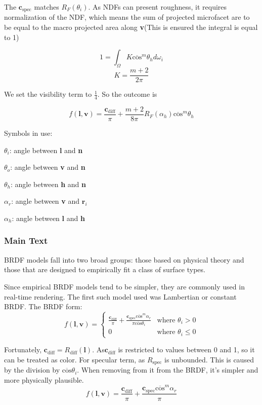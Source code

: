 \documentclass[10pt, a4paper]{article}
\begin{document}
            The $\textbf{c}_{\text{spec}}$ matches $R_F(\theta_i)$. As NDFs can present roughness, it requires normalization of the NDF, which means the sum of projected microfacet are to be equal to the macro projected area along \textbf{v}(This is ensured the integral is equal to 1)

            $$1 = \int_{\Omega}K\overline{\text{cos}}^m\theta_hd\omega_i$$
            $$K = \frac{m + 2}{2\pi}$$

            We set the visibility term to $\frac{1}{4}$. So the outcome is
            
            $$f(\textbf{l}, \textbf{v}) = \frac{\textbf{c}_{\text{diff}}}{\pi} + \frac{m + 2}{8\pi}R_F(\alpha_h)\overline{\text{cos}}^m\theta_h $$

        Symbols in use: 

        $\theta_i$: angle between \textbf{l} and \textbf{n}

        $\theta_o$: angle between \textbf{v} and \textbf{n}

        $\theta_h$: angle between \textbf{h} and \textbf{n}
        
        $\alpha_r$: angle between \textbf{v} and $\textbf{r}_i$

        $\alpha_h$: angle between \textbf{l} and \textbf{h}


        \subsubsection{Main Text}

        BRDF models fall into two broad groups: those based on physical theory and those that are designed to empirically fit a class of surface types. 

        Since empirical BRDF models tend to be simpler, they are commonly used in real-time rendering. The first such model used was Lambertian or constant BRDF. The BRDF form: 
        $$
            f(\textbf{l}, \textbf{v}) =
            \begin{cases}
                \frac{\textbf{c}_{\text{diff}}}{\pi} + \frac{\textbf{c}_{\text{spec}}\overline{\text{cos}}^m\alpha_r}{\pi\overline{\text{cos}}\theta_i} & \text{where } \theta_i > 0 \\
                
                0 & \text{where } \theta_i \leqslant 0 
            \end{cases}
        $$
            
        Fortunately, $\textbf{c}_{\text{diff}} = R_{\text{diff}}(\textbf{l})$. As$\textbf{c}_{\text{diff}}$ is restricted to values between 0 and 1, so it can be treated as color. For specular term, as $R_{\text{spec}}$ is unbounded. This is caused by the division by $\overline{\text{cos}}\theta_i$. When removing from it from the BRDF, it's simpler and more physically plausible.
        $$f(\textbf{l}, \textbf{v}) = \frac{\textbf{c}_{\text{diff}}}{\pi} + \frac{\textbf{c}_{\text{spec}}\overline{\text{cos}}^m\alpha_r}{\pi}$$
        
\end{document}
